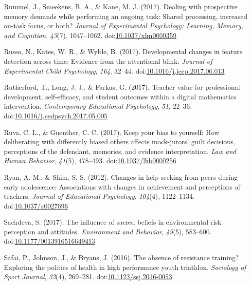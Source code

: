 \documentclass[english,man]{apa6}
\begin{document}
\hypertarget{ref-Rummel2017}{}
Rummel, J., Smeekens, B. A., \& Kane, M. J. (2017). Dealing with
prospective memory demands while performing an ongoing task: Shared
processing, increased on-task focus, or both? \emph{Journal of
Experimental Psychology: Learning, Memory, and Cognition}, \emph{43}(7),
1047--1062.
doi:\href{https://doi.org/10.1037/xlm0000359}{10.1037/xlm0000359}

\hypertarget{ref-Russo2017}{}
Russo, N., Kates, W. R., \& Wyble, B. (2017). Developmental changes in
feature detection across time: Evidence from the attentional blink.
\emph{Journal of Experimental Child Psychology}, \emph{164}, 32--44.
doi:\href{https://doi.org/10.1016/j.jecp.2017.06.013}{10.1016/j.jecp.2017.06.013}

\hypertarget{ref-Rutherford2017}{}
Rutherford, T., Long, J. J., \& Farkas, G. (2017). Teacher value for
professional development, self-efficacy, and student outcomes within a
digital mathematics intervention. \emph{Contemporary Educational
Psychology}, \emph{51}, 22--36.
doi:\href{https://doi.org/10.1016/j.cedpsych.2017.05.005}{10.1016/j.cedpsych.2017.05.005}

\hypertarget{ref-Ruva2017}{}
Ruva, C. L., \& Guenther, C. C. (2017). Keep your bias to yourself: How
deliberating with differently biased others affects mock-jurors' guilt
decisions, perceptions of the defendant, memories, and evidence
interpretation. \emph{Law and Human Behavior}, \emph{41}(5), 478--493.
doi:\href{https://doi.org/10.1037/lhb0000256}{10.1037/lhb0000256}

\hypertarget{ref-Ryan2012}{}
Ryan, A. M., \& Shim, S. S. (2012). Changes in help seeking from peers
during early adolescence: Associations with changes in achievement and
perceptions of teachers. \emph{Journal of Educational Psychology},
\emph{104}(4), 1122--1134.
doi:\href{https://doi.org/10.1037/a0027696}{10.1037/a0027696}

\hypertarget{ref-Sachdeva2017}{}
Sachdeva, S. (2017). The influence of sacred beliefs in environmental
risk perception and attitudes. \emph{Environment and Behavior},
\emph{49}(5), 583--600.
doi:\href{https://doi.org/10.1177/0013916516649413}{10.1177/0013916516649413}

\hypertarget{ref-Safai2016}{}
Safai, P., Johnson, J., \& Bryans, J. (2016). The absence of resistance
training? Exploring the politics of health in high performance youth
triathlon. \emph{Sociology of Sport Journal}, \emph{33}(4), 269--281.
doi:\href{https://doi.org/10.1123/ssj.2016-0053}{10.1123/ssj.2016-0053}
\end{document}
